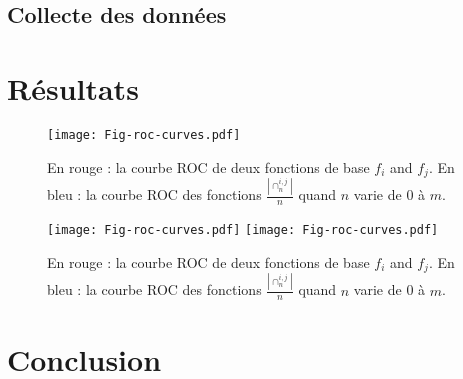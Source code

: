 \documentclass[a4paper, french]{article}
\begin{document}
\subsection{Collecte des données}

\section{Résultats}

\begin{figure}
\centering
\texttt{[image: Fig-roc-curves.pdf]}
\caption{En rouge : la courbe ROC de deux fonctions de base $f_i$ and $f_j$. En bleu : la courbe ROC des fonctions  $\frac{|\cap_n^{i,j}|}{n}$ quand $n$ varie de 0 à $m$. }
\label{fig-roc-curves}
\end{figure}

\begin{figure}
\centering
\texttt{[image: Fig-roc-curves.pdf]}
\texttt{[image: Fig-roc-curves.pdf]}
\caption{En rouge : la courbe ROC de deux fonctions de base $f_i$ and $f_j$. En bleu : la courbe ROC des fonctions  $\frac{|\cap_n^{i,j}|}{n}$ quand $n$ varie de 0 à $m$. }
\label{fig-roc-curves}
\end{figure}



\section{Conclusion}
\end{document}
